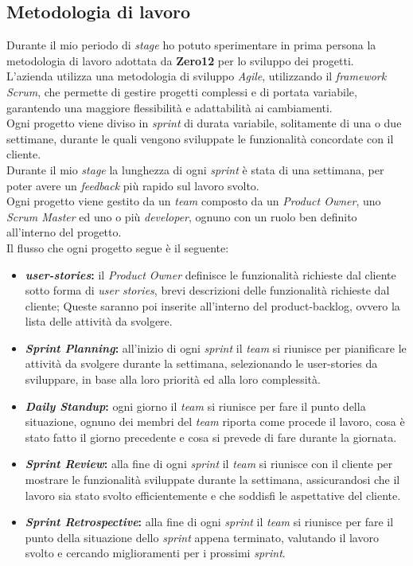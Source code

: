 \subsection{Metodologia di lavoro}
\label{sez:metodologia-lavoro}

Durante il mio periodo di \textit{stage} ho potuto sperimentare in prima persona la metodologia di lavoro adottata da \textbf{Zero12} per lo sviluppo dei progetti.\\
L'azienda utilizza una metodologia di sviluppo \textit{Agile}, utilizzando il \textit{framework} \textit{Scrum}, che permette di gestire progetti complessi e di portata variabile,
garantendo una maggiore flessibilità e adattabilità ai cambiamenti.\\
Ogni progetto viene diviso in \textit{sprint} di durata variabile, solitamente di una o due settimane, durante le quali vengono sviluppate le funzionalità concordate con il cliente.\\
Durante il mio \textit{stage} la lunghezza di ogni \textit{sprint} è stata di una settimana, per poter avere un \textit{feedback} più rapido sul lavoro svolto.\\
Ogni progetto viene gestito da un \textit{team} composto da un \textit{Product Owner}, uno \textit{Scrum Master} ed uno o più \textit{developer}, ognuno con un ruolo ben definito all'interno del progetto.\\

Il flusso che ogni progetto segue è il seguente:
\begin{itemize}
    \item \textbf{\textit{\gls{user-stories}}:} il \textit{Product Owner} definisce le funzionalità richieste dal cliente sotto forma di \textit{user stories}, brevi descrizioni delle funzionalità richieste dal cliente;
    Queste saranno poi inserite all'interno del \gls{product-backlog}, ovvero la lista delle attività da svolgere.
    \item \textbf{\textit{Sprint Planning}:} all'inizio di ogni \textit{sprint} il \textit{team} si riunisce per pianificare le attività da svolgere durante la settimana, selezionando le \gls{user-stories} da sviluppare, 
    in base alla loro priorità ed alla loro complessità.
    \item \textbf{\textit{Daily Standup}:} ogni giorno il \textit{team} si riunisce per fare il punto della situazione, ognuno dei membri del \textit{team} riporta come procede il lavoro,
    cosa è stato fatto il giorno precedente e cosa si prevede di fare durante la giornata.
    \item \textbf{\textit{Sprint Review}:} alla fine di ogni \textit{sprint} il \textit{team} si riunisce con il cliente per mostrare le funzionalità sviluppate durante la settimana, assicurandosi che il lavoro sia stato svolto efficientemente e 
    che soddisfi le aspettative del cliente.
    \item \textbf{\textit{Sprint Retrospective}:} alla fine di ogni \textit{sprint} il \textit{team} si riunisce per fare il punto della situazione dello \textit{sprint} appena terminato, 
    valutando il lavoro svolto e cercando miglioramenti per i prossimi \textit{sprint}.
\end{itemize}